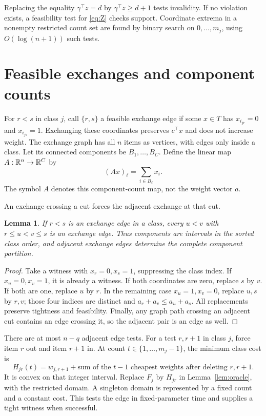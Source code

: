 \documentclass[11pt]{article}
\newtheorem{lemma}[theorem]{Lemma}
\begin{document}
Replacing the equality $\gamma^\top z=d$ by $\gamma^\top z\ge d+1$ tests invalidity. If no violation exists, a feasibility test for \eqref{eq:Z} checks support. Coordinate extrema in a nonempty restricted count set are found by binary search on $0,\ldots,m_j$, using $O(\log(n+1))$ such tests.

\section{Feasible exchanges and component counts}
For $r<s$ in class $j$, call $\{r,s\}$ a feasible exchange edge if some $x\in T$ has $x_{i_{jr}}=0$ and $x_{i_{js}}=1$. Exchanging these coordinates preserves $c^\top x$ and does not increase weight. The exchange graph has all $n$ items as vertices, with edges only inside a class. Let its connected components be $B_1,\ldots,B_C$. Define the linear map $A:\mathbb R^n\to\mathbb R^C$ by
\[
 (Ax)_\ell=\sum_{i\in B_\ell}x_i.
\]
The symbol $A$ denotes this component-count map, not the weight vector $a$.

An exchange crossing a cut forces the adjacent exchange at that cut.
\begin{lemma}\label{lem:interval}
If $r<s$ is an exchange edge in a class, every $u<v$ with $r\le u<v\le s$ is an exchange edge. Thus components are intervals in the sorted class order, and adjacent exchange edges determine the complete component partition.
\end{lemma}
\begin{proof}
Take a witness with $x_r=0,x_s=1$, suppressing the class index. If $x_u=0,x_v=1$, it is already a witness. If both coordinates are zero, replace $s$ by $v$. If both are one, replace $u$ by $r$. In the remaining case $x_u=1,x_v=0$, replace $u,s$ by $r,v$; those four indices are distinct and $a_r+a_v\le a_u+a_s$. All replacements preserve tightness and feasibility. Finally, any graph path crossing an adjacent cut contains an edge crossing it, so the adjacent pair is an edge as well.
\end{proof}

There are at most $n-q$ adjacent edge tests. For a test $r,r+1$ in class $j$, force item $r$ out and item $r+1$ in. At count $t\in\{1,\ldots,m_j-1\}$, the minimum class cost is
\[
 H_{jr}(t)=w_{j,r+1}+\text{sum of the $t-1$ cheapest weights after deleting $r,r+1$}.
\]
It is convex on that integer interval. Replace $F_j$ by $H_{jr}$ in Lemma~\ref{lem:oracle}, with the restricted domain. A singleton domain is represented by a fixed count and a constant cost. This tests the edge in fixed-parameter time and supplies a tight witness when successful.
\end{document}
